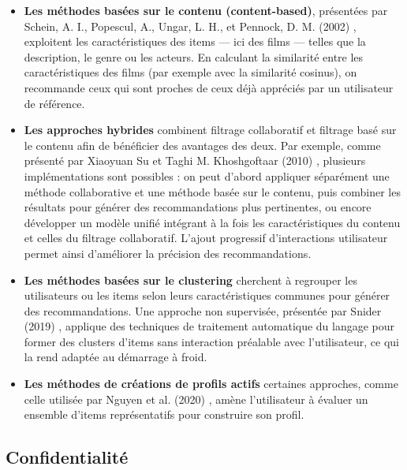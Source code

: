 \documentclass{article}
\begin{document}
\begin{itemize}
    \item \textbf{Les méthodes basées sur le contenu (content-based)}, présentées par Schein, A. I., Popescul, A., Ungar, L. H., et Pennock, D. M. (2002) \cite{schein2002_methods}, exploitent les caractéristiques des items — ici des films — 
    telles que la description, le genre ou les acteurs. En calculant la similarité entre les caractéristiques des films (par exemple avec la similarité cosinus), on recommande ceux qui sont proches de ceux déjà appréciés par un utilisateur de référence.
    \item \textbf{Les approches hybrides} combinent filtrage collaboratif et filtrage basé sur le contenu afin de bénéficier des avantages des deux. Par exemple, comme présenté par Xiaoyuan Su et Taghi M. Khoshgoftaar (2010) \cite{su_cf_survey}, 
    plusieurs implémentations sont possibles : on peut d’abord appliquer séparément une méthode collaborative et une méthode basée sur le contenu, puis combiner les résultats pour générer des recommandations plus pertinentes, ou encore développer 
    un modèle unifié intégrant à la fois les caractéristiques du contenu et celles du filtrage collaboratif. L’ajout progressif d’interactions utilisateur permet ainsi d’améliorer la précision des recommandations.
    \item \textbf{Les méthodes basées sur le clustering} cherchent à regrouper les utilisateurs ou les items selon leurs caractéristiques communes pour générer des recommandations. Une approche non supervisée, présentée par Snider 
    (2019) \cite{snider_unsupervised}, applique des techniques de traitement automatique du langage pour former des clusters d’items sans interaction préalable avec l’utilisateur, ce qui la rend adaptée au démarrage à froid.
    \item \textbf{Les méthodes de créations de profils actifs} certaines approches, comme celle utilisée par Nguyen et al. (2020) \cite{nguyen2024_ere}, amène l’utilisateur à évaluer un ensemble d’items représentatifs 
    pour construire son profil.
\end{itemize}

\subsection{Confidentialité}
\end{document}
